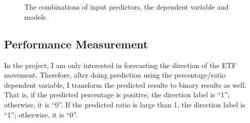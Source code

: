 \documentclass[letterpaper]{article}
\begin{document}
\begin{figure}
  \centering
     \\
     \\
  \caption{The combinations of input predictors, the dependent variable and
  models}
  \label{combinations}
\end{figure}

\subsection{Performance Measurement}
In the project, I am only interested in forecasting the direction of the
ETF movement. Therefore, after doing prediction using the percentage/ratio
dependent variable, I transform the predicted results to binary results as
well. That is, if the predicted percentage is positive, the direction label is
“1”; otherwise, it is “0”. If the predicted ratio is large than 1, the
direction label is “1”; otherwise, it is “0”.
\end{document}
